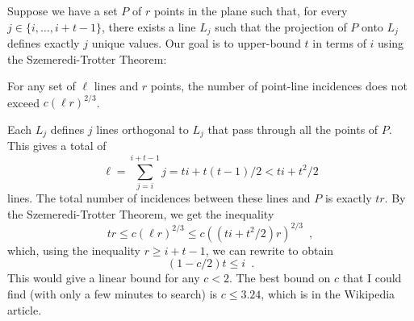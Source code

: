 \documentclass{article}
\begin{document}
Suppose we have a set $P$ of $r$ points in the plane such that, for every
$j\in\{i,\ldots,i+t-1\}$, there exists a line $L_j$ such that the
projection of $P$ onto $L_j$ defines exactly $j$ unique values.  Our goal
is to upper-bound $t$ in terms of $i$ using the Szemeredi-Trotter Theorem:

For any set of $\ell$ lines and $r$ points, the number of point-line
incidences does not exceed $c(\ell r)^{2/3}$.

Each $L_j$ defines $j$ lines orthogonal to $L_j$ that pass through all the
points of $P$.  This gives a total of 
\[
   \ell = \sum_{j=i}^{i+t-1} j = ti + t(t-1)/2 < ti + t^2/2
\]
lines.  The total number of incidences between these lines and $P$ is
exactly $tr$.  By the Szemeredi-Trotter Theorem, we get the inequality
\[
    tr \le c(\ell r)^{2/3} \le c((ti+t^2/2)r)^{2/3}  \enspace ,
\]
which, using the inequality $r \ge i+t-1$, we can rewrite to obtain
\[
    (1-c/2)t \le i   \enspace .
\]
This would give a linear bound for any $c < 2$.  The best bound on $c$ that
I could find (with only a few minutes to search) is $c\le 3.24$, which is
in the Wikipedia article.
\end{document}
